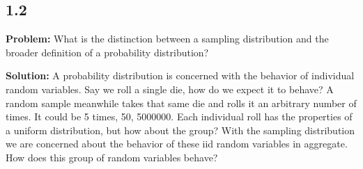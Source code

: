 \subsection*{1.2}

\textbf{Problem:} What is the distinction between a sampling distribution and the broader definition of a probability distribution?

\textbf{Solution:} A probability distribution is concerned with the behavior of individual random variables. Say we roll a single die, how do we expect it to behave? A random sample meanwhile takes that same die and rolls it an arbitrary number of times. It could be 5 times, 50, 5000000. Each individual roll has the properties of a uniform distribution, but how about the group? With the sampling distribution we are concerned about the behavior of these iid random variables in aggregate. How does this group of random variables behave? 
